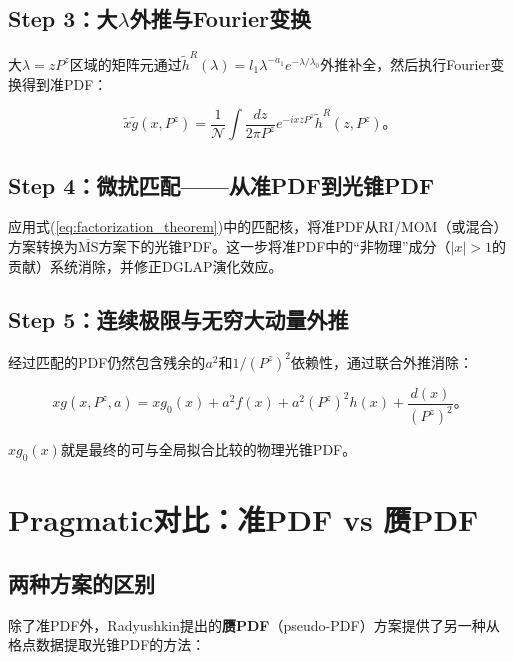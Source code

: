 \documentclass[12pt,a4paper]{ctexart}
\theoremstyle{definition}
\begin{document}
\subsection{Step 3：大$\lambda$外推与Fourier变换}

大$\lambda = zP^z$区域的矩阵元通过$\tilde{h}^R(\lambda) = l_1 \lambda^{-a_1} e^{-\lambda/\lambda_0}$外推补全\cite{Chen2025gluon}，然后执行Fourier变换得到准PDF：

\begin{equation}
\tilde{x}\tilde{g}(x, P^z) = \frac{1}{\mathcal{N}} \int \frac{dz}{2\pi P^z} e^{-ixzP^z} \tilde{h}^R(z, P^z)。
\end{equation}

\subsection{Step 4：微扰匹配——从准PDF到光锥PDF}

应用式(\ref{eq:factorization_theorem})中的匹配核，将准PDF从RI/MOM（或混合）方案转换为$\overline{\text{MS}}$方案下的光锥PDF。这一步将准PDF中的``非物理''成分（$|x|>1$的贡献）系统消除，并修正DGLAP演化效应。

\subsection{Step 5：连续极限与无穷大动量外推}

经过匹配的PDF仍然包含残余的$a^2$和$1/(P^z)^2$依赖性，通过联合外推消除\cite{Chen2025gluon}：

\begin{equation}
xg(x, P^z, a) = xg_0(x) + a^2 f(x) + a^2 (P^z)^2 h(x) + \frac{d(x)}{(P^z)^2}。
\end{equation}

$xg_0(x)$就是最终的可与全局拟合比较的物理光锥PDF。

\section{Pragmatic对比：准PDF vs 赝PDF}

\subsection{两种方案的区别}

除了准PDF外，Radyushkin提出的\textbf{赝PDF}（pseudo-PDF）方案\cite{Radyushkin2018one_loop}提供了另一种从格点数据提取光锥PDF的方法：
\end{document}
